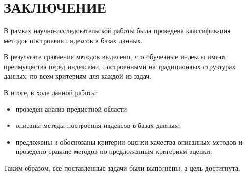 \chapter*{ЗАКЛЮЧЕНИЕ}

В рамках научно-исследовательской работы была проведена классификация методов
построения индексов в базах данных.

В результате сравнения методов выделено, что обученные индексы имеют
преимущества перед индексами, построенными на традиционных структурах данных, по
всем критериям для каждой из задач.

В итоге, в ходе данной работы:
\begin{itemize}
    \item проведен анализ предметной области
    \item описаны методы построения индексов в базах данных;
    \item предложены и обоснованы критерии оценки качества описанных методов
      и проведено сравние методов по предложенным критериям оценки.
\end{itemize}

Таким образом, все поставленные задачи были выполнены, а цель достигнута.
